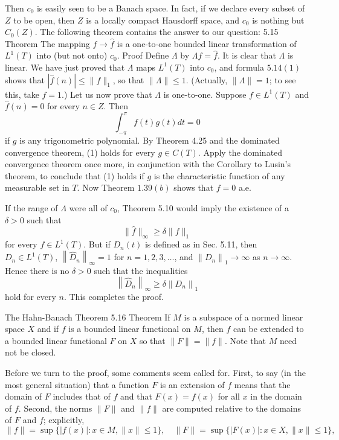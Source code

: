 Then $c_0$ is easily seen to be a Banach space. In fact, if we declare every subset of $Z$ to be open, then $Z$ is a locally compact Hausdorff space, and $c_0$ is nothing but $C_0(Z)$.
The following theorem contains the answer to our question:
5.15 Theorem The mapping $f \rightarrow \hat{f}$ is a one-to-one bounded linear transformation of $L^1(T)$ into (but not onto) $c_0$.
Proof Define $\Lambda$ by $\Lambda f=\hat{f}$. It is clear that $\Lambda$ is linear. We have just proved that $\Lambda$ maps $L^1(T)$ into $c_0$, and formula $5.14(1)$ shows that $|\hat{f}(n)| \leq\|f\|_1$, so that $\|\Lambda\| \leq 1$. (Actually, $\|\Lambda\|=1$; to see this, take $f=1$.) Let us now prove that $\Lambda$ is one-to-one. Suppose $f \in L^1(T)$ and $\hat{f}(n)=0$ for every $n \in Z$. Then
$$
\int_{-\pi}^\pi f(t) g(t) d t=0
$$
if $g$ is any trigonometric polynomial. By Theorem 4.25 and the dominated convergence theorem, (1) holds for every $g \in C(T)$. Apply the dominated convergence theorem once more, in conjunction with the Corollary to Lusin's theorem, to conclude that (1) holds if $g$ is the characteristic function of any measurable set in $T$. Now Theorem $1.39(b)$ shows that $f=0$ a.e.

If the range of $\Lambda$ were all of $c_0$, Theorem 5.10 would imply the existence of a $\delta>0$ such that
$$
\|\hat{f}\|_{\infty} \geq \delta\|f\|_1
$$
for every $f \in L^1(T)$. But if $D_n(t)$ is defined as in Sec. 5.11, then $D_n \in L^1(T)$, $\left\|\hat{D}_n\right\|_{\infty}=1$ for $n=1,2,3, \ldots$, and $\left\|D_n\right\|_1 \rightarrow \infty$ as $n \rightarrow \infty$. Hence there is no $\delta>0$ such that the inequalities
$$
\left\|\hat{D}_n\right\|_{\infty} \geq \delta\left\|D_n\right\|_1
$$
hold for every $n$.
This completes the proof.

The Hahn-Banach Theorem
5.16 Theorem If $M$ is a subspace of a normed linear space $X$ and if $f$ is a bounded linear functional on $M$, then $f$ can be extended to a bounded linear functional $F$ on $X$ so that $\|F\|=\|f\|$.
Note that $M$ need not be closed.

Before we turn to the proof, some comments seem called for. First, to say (in the most general situation) that a function $F$ is an extension of $f$ means that the domain of $F$ includes that of $f$ and that $F(x)=f(x)$ for all $x$ in the domain of $f$. Second, the norms $\|F\|$ and $\|f\|$ are computed relative to the domains of $F$ and $f$; explicitly,
$$
\|f\|=\sup \{|f(x)|: x \in M,\|x\| \leq 1\}, \quad\|F\|=\sup \{|F(x)|: x \in X,\|x\| \leq 1\},
$$

